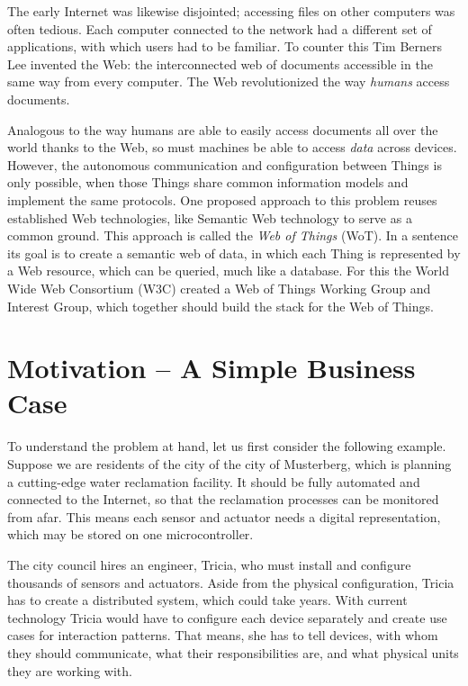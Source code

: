 The early Internet was likewise disjointed; accessing files on other computers was often tedious. Each computer connected to the network had a different set of applications, with which users had to be familiar. To counter this Tim Berners Lee invented the Web: the interconnected web of documents accessible in the same way from every computer. The Web revolutionized the way \textit{humans} access documents.


Analogous to the way humans are able to easily access documents all over the world thanks to the Web, so must machines be able to access \textit{data} across devices. However, the autonomous communication and configuration between Things is only possible, when those Things share common information models and implement the same protocols. One proposed approach to this problem reuses established Web technologies, like Semantic Web technology to serve as a common ground. This approach is called the \textit{Web of Things} (WoT). In a sentence its goal is to create a semantic web of data, in which each Thing is represented by a Web resource, which can be queried, much like a database. For this the World Wide Web Consortium (W3C) created a Web of Things Working Group and Interest Group, which together should build the stack for the Web of Things. \cite{.13Nov17}



\section{Motivation -- A Simple Business Case}
To understand the problem at hand, let us first consider the following example. Suppose we are residents of the city of the city of Musterberg, which is planning a cutting-edge water reclamation facility. It should be fully automated and connected to the Internet, so that the reclamation processes can be monitored from afar. This means each sensor and actuator needs a digital representation, which may be stored on one microcontroller.

The city council hires an engineer, Tricia, who must install and configure thousands of sensors and actuators. Aside from the physical configuration, Tricia has to create a distributed system, which could take years. With current technology Tricia would have to configure each device separately and create use cases for interaction patterns. That means, she has to tell devices, with whom they should communicate, what their responsibilities are, and what physical units they are working with.

